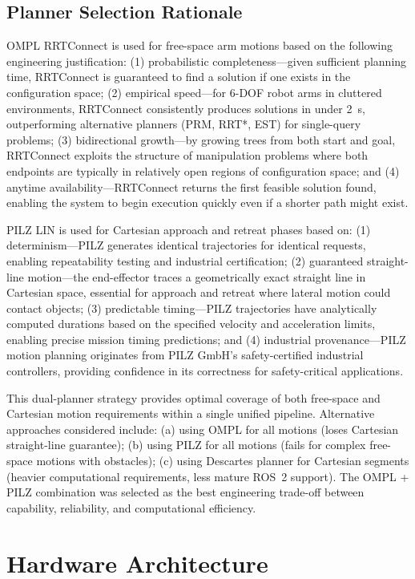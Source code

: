 \documentclass[12pt,a4paper,oneside]{report}
\begin{document}
\subsection{Planner Selection Rationale}

OMPL RRTConnect is used for free-space arm motions based on the following engineering justification: (1) probabilistic completeness---given sufficient planning time, RRTConnect is guaranteed to find a solution if one exists in the configuration space; (2) empirical speed---for 6-DOF robot arms in cluttered environments, RRTConnect consistently produces solutions in under 2~s, outperforming alternative planners (PRM, RRT*, EST) for single-query problems; (3) bidirectional growth---by growing trees from both start and goal, RRTConnect exploits the structure of manipulation problems where both endpoints are typically in relatively open regions of configuration space; and (4) anytime availability---RRTConnect returns the first feasible solution found, enabling the system to begin execution quickly even if a shorter path might exist.

PILZ LIN is used for Cartesian approach and retreat phases based on: (1) determinism---PILZ generates identical trajectories for identical requests, enabling repeatability testing and industrial certification; (2) guaranteed straight-line motion---the end-effector traces a geometrically exact straight line in Cartesian space, essential for approach and retreat where lateral motion could contact objects; (3) predictable timing---PILZ trajectories have analytically computed durations based on the specified velocity and acceleration limits, enabling precise mission timing predictions; and (4) industrial provenance---PILZ motion planning originates from PILZ GmbH's safety-certified industrial controllers, providing confidence in its correctness for safety-critical applications.

This dual-planner strategy provides optimal coverage of both free-space and Cartesian motion requirements within a single unified pipeline. Alternative approaches considered include: (a) using OMPL for all motions (loses Cartesian straight-line guarantee); (b) using PILZ for all motions (fails for complex free-space motions with obstacles); (c) using Descartes planner for Cartesian segments (heavier computational requirements, less mature ROS~2 support). The OMPL + PILZ combination was selected as the best engineering trade-off between capability, reliability, and computational efficiency.

\section{Hardware Architecture}
\end{document}
